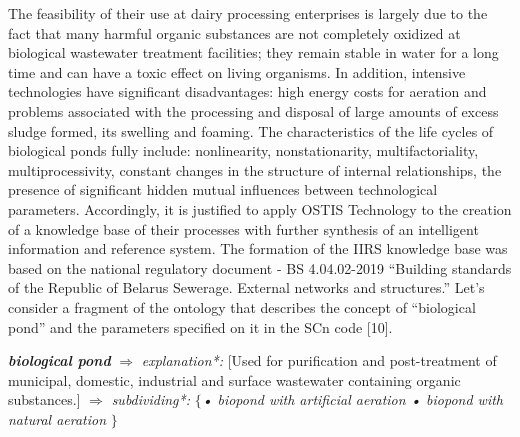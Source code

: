 \documentclass{article}
\begin{document}
\begin{multicols}{2}
{}The feasibility of their use at dairy processing enterprises is largely due to the fact that many harmful organic
substances are not completely oxidized at biological
wastewater treatment facilities; they remain stable in
water for a long time and can have a toxic effect on
living organisms. In addition, intensive technologies have
significant disadvantages: high energy costs for aeration
and problems associated with the processing and disposal
of large amounts of excess sludge formed, its swelling
and foaming.
\vspace{

}The characteristics of the life cycles of biological
ponds fully include: nonlinearity, nonstationarity, multifactoriality, multiprocessivity, constant changes in the
structure of internal relationships, the presence of significant hidden mutual influences between technological
parameters. Accordingly, it is justified to apply OSTIS
Technology to the creation of a knowledge base of
their processes with further synthesis of an intelligent
information and reference system.
\vspace{

}The formation of the IIRS knowledge base was based
on the national regulatory document - BS 4.04.02-2019
“Building standards of the Republic of Belarus Sewerage. External networks and structures.” Let’s consider a
fragment of the ontology that describes the concept of
“biological pond” and the parameters specified on it in
the SCn code [10]. 

\vspace{0.2cm}



\textit{\textbf{biological pond}}
\vspace{

}
$\Rightarrow$ \textit{explanation*:}
\vspace{

}
[Used for purification and post-treatment of municipal, domestic, industrial and surface wastewater
containing organic substances.]
\vspace{

}
$\Rightarrow$ \textit{subdividing*:}
\vspace{

}
\textit{$\{$• biopond with artificial aeration}
\vspace{

}
\textit{• biopond with natural aeration}
\vspace{

}
$\}$
\vspace{

}
\end{multicols}
\end{document}
